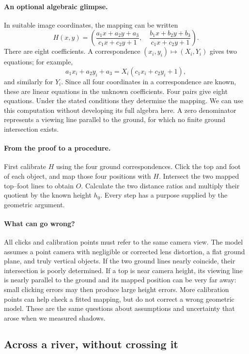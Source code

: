 \paragraph{An optional algebraic glimpse.}
In suitable image coordinates, the mapping can be written
\[
H(x,y)=\left(
\frac{a_1x+a_2y+a_3}{c_1x+c_2y+1},\quad
\frac{b_1x+b_2y+b_3}{c_1x+c_2y+1}
\right).
\]
There are eight coefficients. A correspondence $(x_i,y_i)\mapsto(X_i,Y_i)$
gives two equations; for example,
\[
a_1x_i+a_2y_i+a_3=X_i(c_1x_i+c_2y_i+1),
\]
and similarly for $Y_i$. Since all four coordinates in a correspondence
are known, these are linear equations in the unknown coefficients. Four
pairs give eight equations. Under the stated conditions they determine
the mapping. We can use this computation without developing its full
algebra here. A zero denominator represents a viewing line parallel to
the ground, for which no finite ground intersection exists.

\paragraph{From the proof to a procedure.}
First calibrate $H$ using the four ground correspondences. Click the top
and foot of each object, and map those four positions with $H$. Intersect
the two mapped top--foot lines to obtain $O$. Calculate the two distance
ratios and multiply their quotient by the known height $h_0$. Every step
has a purpose supplied by the geometric argument.

\paragraph{What can go wrong?}
All clicks and calibration points must refer to the same camera view.
The model assumes a point camera with negligible or corrected lens
distortion, a flat ground plane, and truly vertical objects. If the two
ground lines nearly coincide, their intersection is poorly determined.
If a top is near camera height, its viewing line is nearly parallel to
the ground and its mapped position can be very far away: small clicking
errors may then produce large height errors. More calibration points can
help check a fitted mapping, but do not correct a wrong geometric model.
These are the same questions about assumptions and uncertainty that arose
when we measured shadows.

\subsection{Across a river, without crossing it}
